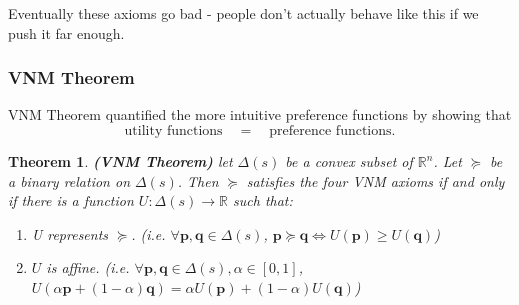 \documentclass[13pt]{article}
\newtheorem{theorem}{Theorem}[section]
\theoremstyle{definition}
\theoremstyle{remark}
\newenvironment{remark}
  {\pushQED{\qed}\renewcommand{\qedsymbol}{$\triangle$}\remarkx}
  {\popQED\endremarkx}
\begin{document}
\begin{remark}
    Eventually these axioms go bad - people don't actually behave like this if we push it far enough. 
\end{remark}

\subsubsection{VNM Theorem}
VNM Theorem quantified the more intuitive preference functions by showing that 
\[
\text{utility functions}\quad = \quad \text{preference functions}.
\]
\begin{theorem}\textbf{(VNM Theorem)} let $\Delta(s)$ be a convex subset of ${\mathbb{R}^n}$. Let $\succeq$ be a binary relation on $\Delta(s)$. Then $\succeq$ satisfies the four VNM axioms if and only if there is a function $U:\Delta(s)\rightarrow\mathbb{R}$ such that:
\begin{enumerate}[label=(\alph*)]
    \item U represents $\succeq$.  (i.e. $\forall \mathbf{p}, \mathbf{q}\in\Delta(s)$, $\mathbf{p}\succeq \mathbf{q} \iff U(\mathbf{p})\geq U(\mathbf{q})$)
    \item $U$ is affine. (i.e. $\forall \mathbf{p},\mathbf{q}\in\Delta(s), \alpha\in[0, 1]$, $U(\alpha \mathbf{p} + (1- \alpha)\mathbf{q}) = \alpha U(\mathbf{p}) + (1- \alpha)U(\mathbf{q})$)
\end{enumerate}
\end{theorem}
\end{document}
